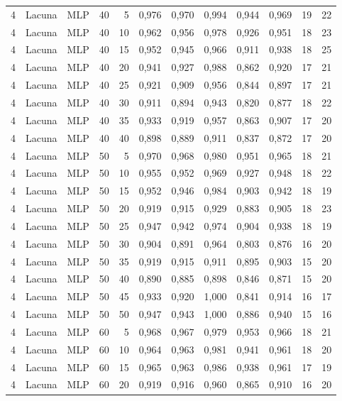 \begin{longtable}{@{}rllrrrrrrrrr@{}}
4 & Lacuna & MLP & 40 & 5 & 0,976 & 0,970 & 0,994 & 0,944 & 0,969 & 19 & 22 \\
4 & Lacuna & MLP & 40 & 10 & 0,962 & 0,956 & 0,978 & 0,926 & 0,951 & 18 & 23 \\
4 & Lacuna & MLP & 40 & 15 & 0,952 & 0,945 & 0,966 & 0,911 & 0,938 & 18 & 25 \\
4 & Lacuna & MLP & 40 & 20 & 0,941 & 0,927 & 0,988 & 0,862 & 0,920 & 17 & 21 \\
4 & Lacuna & MLP & 40 & 25 & 0,921 & 0,909 & 0,956 & 0,844 & 0,897 & 17 & 21 \\
4 & Lacuna & MLP & 40 & 30 & 0,911 & 0,894 & 0,943 & 0,820 & 0,877 & 18 & 22 \\
4 & Lacuna & MLP & 40 & 35 & 0,933 & 0,919 & 0,957 & 0,863 & 0,907 & 17 & 20 \\
4 & Lacuna & MLP & 40 & 40 & 0,898 & 0,889 & 0,911 & 0,837 & 0,872 & 17 & 20 \\
4 & Lacuna & MLP & 50 & 5 & 0,970 & 0,968 & 0,980 & 0,951 & 0,965 & 18 & 21 \\
4 & Lacuna & MLP & 50 & 10 & 0,955 & 0,952 & 0,969 & 0,927 & 0,948 & 18 & 22 \\
4 & Lacuna & MLP & 50 & 15 & 0,952 & 0,946 & 0,984 & 0,903 & 0,942 & 18 & 19 \\
4 & Lacuna & MLP & 50 & 20 & 0,919 & 0,915 & 0,929 & 0,883 & 0,905 & 18 & 23 \\
4 & Lacuna & MLP & 50 & 25 & 0,947 & 0,942 & 0,974 & 0,904 & 0,938 & 18 & 19 \\
4 & Lacuna & MLP & 50 & 30 & 0,904 & 0,891 & 0,964 & 0,803 & 0,876 & 16 & 20 \\
4 & Lacuna & MLP & 50 & 35 & 0,919 & 0,915 & 0,911 & 0,895 & 0,903 & 15 & 20 \\
4 & Lacuna & MLP & 50 & 40 & 0,890 & 0,885 & 0,898 & 0,846 & 0,871 & 15 & 20 \\
4 & Lacuna & MLP & 50 & 45 & 0,933 & 0,920 & 1,000 & 0,841 & 0,914 & 16 & 17 \\
4 & Lacuna & MLP & 50 & 50 & 0,947 & 0,943 & 1,000 & 0,886 & 0,940 & 15 & 16 \\
4 & Lacuna & MLP & 60 & 5 & 0,968 & 0,967 & 0,979 & 0,953 & 0,966 & 18 & 21 \\
4 & Lacuna & MLP & 60 & 10 & 0,964 & 0,963 & 0,981 & 0,941 & 0,961 & 18 & 20 \\
4 & Lacuna & MLP & 60 & 15 & 0,965 & 0,963 & 0,986 & 0,938 & 0,961 & 17 & 19 \\
4 & Lacuna & MLP & 60 & 20 & 0,919 & 0,916 & 0,960 & 0,865 & 0,910 & 16 & 20 \\

\end{longtable}
